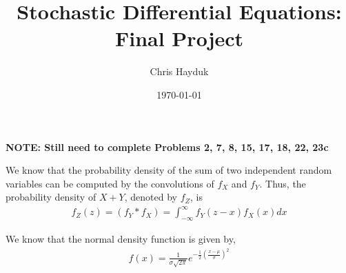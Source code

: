 \documentclass[12pt]{article}
\newenvironment{problem}[2][Problem]{\begin{trivlist}
\item[\hskip \labelsep {\bfseries #1}\hskip \labelsep {\bfseries #2.}]}{\end{trivlist}}
\begin{document}
\title{Stochastic Differential Equations: Final Project}

\author{Chris Hayduk}
\date{\today}

\maketitle

\textbf{NOTE: Still need to complete Problems 2, 7, 8, 15, 17, 18, 22, 23c}

\begin{problem}{1}
\end{problem}

We know that the probability density of the sum of two independent random variables can be computed by the convolutions of $f_X$ and $f_Y$. Thus, the probability density of $X + Y$, denoted by $f_Z$, is
\begin{align}
f_Z(z) = (f_Y*f_X) = \int_{-\infty}^{\infty}  f_Y(z - x)f_X(x) dx
\end{align}

We know that the normal density function is given by,
\begin{align*}
f(x) = \frac{1}{\sigma\sqrt{2\pi}} e^{-\frac{1}{2}\left(\frac{x-\mu}{\sigma}\right)^2}
\end{align*}
\end{document}
